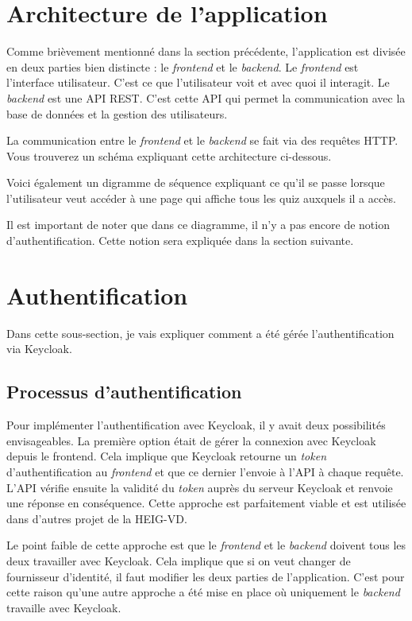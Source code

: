 \section{Architecture de l'application}
Comme brièvement mentionné dans la section précédente, l'application est divisée en deux parties bien distincte : le \emph{frontend} et le \emph{backend}. Le \emph{frontend} est l'interface utilisateur. C'est ce que l'utilisateur voit et avec quoi il interagit. Le \emph{backend} est une API REST. C'est cette API qui permet la communication avec la base de données et la gestion des utilisateurs.

La communication entre le \emph{frontend} et le \emph{backend} se fait via des requêtes HTTP. Vous trouverez un schéma expliquant cette architecture ci-dessous.


Voici également un digramme de séquence expliquant ce qu'il se passe lorsque l'utilisateur veut accéder à une page qui affiche tous les quiz auxquels il a accès.


Il est important de noter que dans ce diagramme, il n'y a pas encore de notion d'authentification. Cette notion sera expliquée dans la section suivante.

\section{Authentification}
Dans cette sous-section, je vais expliquer comment a été gérée l'authentification via Keycloak.

\subsection{Processus d'authentification}
Pour implémenter l'authentification avec Keycloak, il y avait deux possibilités envisageables. La première option était de gérer la connexion avec Keycloak depuis le frontend. Cela implique que Keycloak retourne un \emph{token} d'authentification au \emph{frontend} et que ce dernier l'envoie à l'API à chaque requête. L'API vérifie ensuite la validité du \emph{token} auprès du serveur Keycloak et renvoie une réponse en conséquence. Cette approche est parfaitement viable et est utilisée dans d'autres projet de la HEIG-VD.

Le point faible de cette approche est que le \emph{frontend} et le \emph{backend} doivent tous les deux travailler avec Keycloak. Cela implique que si on veut changer de fournisseur d'identité, il faut modifier les deux parties de l'application.
C'est pour cette raison qu'une autre approche a été mise en place où uniquement le \emph{backend} travaille avec Keycloak.

